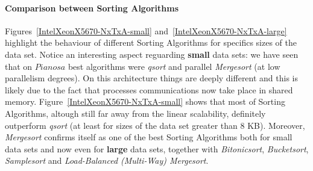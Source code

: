 \paragraph{Comparison between Sorting Algorithms} Figures~\ref{IntelXeonX5670-NxTxA-small} and~\ref{IntelXeonX5670-NxTxA-large} highlight the behaviour of different Sorting Algorithms for specifics sizes of the data set. Notice an interesting aspect reguarding \textbf{small} data sets: we have seen that on $Pianosa$ best algorithms were \textit{qsort} and parallel \textit{Mergesort} (at low parallelism degrees). On this architecture things are deeply different and this is likely due to the fact that processes communications now take place in shared memory. Figure~\ref{IntelXeonX5670-NxTxA-small} shows that most of Sorting Algorithms, altough still far away from the linear scalability, definitely outperform \textit{qsort} (at least for sizes of the data set greater than 8 KB). Moreover, \textit{Mergesort} confirms itself as one of the best Sorting Algorithms both for small data sets and now even for \textbf{large} data sets, together with \textit{Bitonicsort}, \textit{Bucketsort}, \textit{Samplesort} and \textit{Load-Balanced (Multi-Way) Mergesort}.

